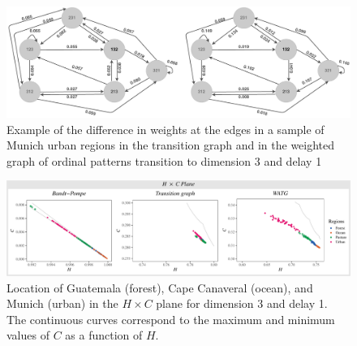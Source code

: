 \documentclass[journal]{IEEEtran}
\begin{document}
\begin{itemize}
	\begin{figure}[hbt]
		\includegraphics[width=2\columnwidth]{Figures/graphs.pdf}
		\caption{Example of the difference in weights at the edges in a sample of Munich urban regions in the transition graph and in the weighted graph of ordinal patterns
			transition to dimension 3 and delay 1}
		\label{fig:graphs}
	\end{figure}
	
	\begin{figure}[hbt]
		\includegraphics[width=2\columnwidth]{Figures/HCAnalysis.pdf}
		\caption{Location of Guatemala (forest), Cape Canaveral (ocean), and Munich (urban) in the $H \times C$ plane for dimension 3 and delay 1. 
			The continuous curves correspond to the maximum and minimum values of $C$ as a function of $H$.}
		\label{fig:plotsHC}
	\end{figure}
	

\end{itemize}
\end{document}

